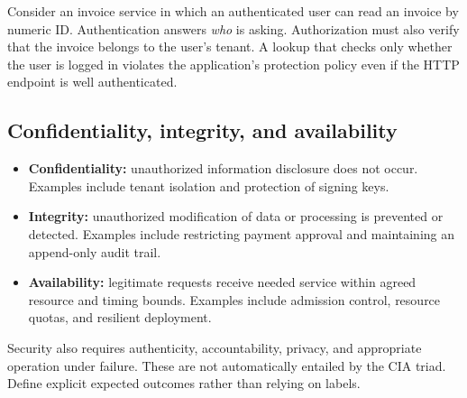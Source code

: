 \documentclass[
  letterpaper,
]{article}
\providecommand{\tightlist}{%
  \setlength{\itemsep}{0pt}\setlength{\parskip}{0pt}}
\begin{document}
Consider an invoice service in which an authenticated user can read an
invoice by numeric ID. Authentication answers \emph{who} is asking.
Authorization must also verify that the invoice belongs to the user's
tenant. A lookup that checks only whether the user is logged in violates
the application's protection policy even if the HTTP endpoint is well
authenticated.

\subsection{Confidentiality, integrity, and
availability}\label{confidentiality-integrity-and-availability}

\begin{itemize}
\tightlist
\item
  \textbf{Confidentiality:} unauthorized information disclosure does not
  occur. Examples include tenant isolation and protection of signing
  keys.
\item
  \textbf{Integrity:} unauthorized modification of data or processing is
  prevented or detected. Examples include restricting payment approval
  and maintaining an append-only audit trail.
\item
  \textbf{Availability:} legitimate requests receive needed service
  within agreed resource and timing bounds. Examples include admission
  control, resource quotas, and resilient deployment.
\end{itemize}

Security also requires authenticity, accountability, privacy, and
appropriate operation under failure. These are not automatically
entailed by the CIA triad. Define explicit expected outcomes rather than
relying on labels.
\end{document}
